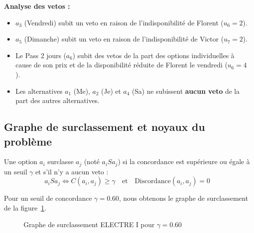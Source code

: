 \documentclass[11pt,a4paper]{article}
\begin{document}
\textbf{Analyse des vetos :}
\begin{itemize}
    \item $a_3$ (Vendredi) subit un veto en raison de l'indisponibilité de Florent ($u_6 = 2$).
    \item $a_5$ (Dimanche) subit un veto en raison de l'indisponibilité de Victor ($u_7 = 2$).
    \item Le Pass 2 jours ($a_6$) subit des vetos de la part des options individuelles à cause de son prix et de la disponibilité réduite de Florent le vendredi ($u_6 = 4$).
    \item Les alternatives $a_1$ (Me), $a_2$ (Je) et $a_4$ (Sa) ne subissent \textbf{aucun veto} de la part des autres alternatives.
\end{itemize}

\subsection{Graphe de surclassement et noyaux du problème}
Une option $a_i$ surclasse $a_j$ (noté $a_i S a_j$) si la concordance est supérieure ou égale à un seuil $\gamma$ et s'il n'y a aucun veto :
$$a_i S a_j \iff C(a_i, a_j) \ge \gamma \quad \text{et} \quad \text{Discordance}(a_i, a_j) = 0$$

Pour un seuil de concordance $\gamma = 0.60$, nous obtenons le graphe de surclassement de la figure~\ref{fig:graphe_surclassement}.

\begin{figure}[H]
  \centering
  \caption{Graphe de surclassement ELECTRE I pour $\gamma = 0.60$}
  \label{fig:graphe_surclassement}
\end{figure}
\end{document}
